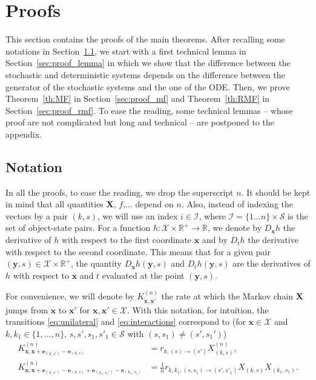\documentclass[acmsmall]{acmart}
\newcommand\bx{\mathbf{x}}
\newcommand\be{\mathbf{e}}
\newcommand\bX{\mathbf{X}}
\newcommand\by{\mathbf{y}}
\newcommand\calX{\mathcal{X}}
\newcommand\calI{\mathcal{I}}
\newcommand\calS{\mathcal{S}}
\newcommand\toN{^{(n)}}
\newcommand{\R}{\ensuremath{\mathbb{R}}}
\begin{document}

\section{Proofs}
\label{sec:proofs}

This section contains the proofs of the main theorems. After recalling some notations in Section~\ref{sec:proof_notation}, we start with a first technical lemma in Section~\ref{sec:proof_lemma} in which we show that the difference between the stochastic and deterministic systems depends on the difference between the generator of the stochastic systems and the one of the ODE. Then, we prove Theorem~\ref{th:MF} in Section~\ref{sec:proof_mf} and Theorem~\ref{th:RMF} in Section~\ref{sec:proof_rmf}. To ease the reading, some technical lemmas -- whose proof are not complicated but long and technical -- are postponed to the appendix.


\subsection{Notation}
\label{sec:proof_notation}

In all the proofs, to ease the reading, we drop the superscript $n$. It should be kept in mind that all quantities $\bX$, $f$,... depend on $n$. Also, instead of indexing the vectors by a pair $(k,s)$, we will use an index $i\in\calI$, where $\calI=\{1\dots n\}\times\calS$ is the set of object-state pairs. For a function $h:\calX\times \R^+\to\R$, we denote by $D_\bx h$ the derivative of $h$ with respect to the first coordinate $\bx$ and by $D_th$ the derivative with respect to the second coordinate. This means that for a given pair $(\by,s)\in\calX \times \R^+$, the quantity $D_\bx h(\by,s)$ and $D_t h(\by,s)$ are the derivatives of $h$ with respect to $\bx$ and $t$ evaluated at the point $(\by,s)$.


For convenience, we will denote by $K_{\bx,\bx'}^{(n)}$ the rate at which the Markov chain $\bX$ jumps from $\bx$ to $\bx'$ for $\bx,\bx'\in\calX$. With this notation, for intuition, the transitions \eqref{eq:unilateral} and \eqref{eq:interactions} correspond to (for $\bx\in\calX$ and $k,k_1\in\{1,\dots, n\}$, $s,s',s_1,s'_1\in\calS$ with $(s,s_1) \ne (s',s_1')$)
\begin{align*}
  K_{\bx, \bx + \be_{(k,s')}-\be_{(k,s)}}\toN &= r_{k,(s)\rightarrow(s')} X_{(k,s)}\toN, \\
  K_{\bx, \bx + \be_{(k,s')}-\be_{(k,s)} + \be_{(k_1,s_1')}-\be_{(k_1,s_1)}}\toN &= \frac1n r_{k,k_1,(s,s_1)\rightarrow(s',s'_1)} X_{(k,s)}X_{(k_1,s_1)}.
\end{align*}
\end{document}
